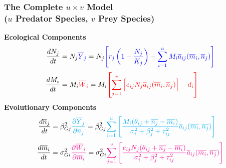 \documentclass[10pt]{beamer}
\begin{document}
\begin{frame}
	\frametitle{The Complete $u\times v$ Model \\ ($u$ Predator Species, $v$ Prey Species)}
	{\bf Ecological Components}
	\begin{align*}
		\frac{dN_j}{dt} &= N_j{\color{blue}\overline{Y}_j} = N_j {\color{blue}\left[r_j\left(1 - \frac{N_j}{K_j}\right) - \sum\limits_{i = 1}^{u}M_i\overline{a}_{ij}(\overline{m}_i, \overline{n}_j)\right]} \\[.1cm]
		\frac{dM_i}{dt} &= M_i{\color{red}\overline{W}_i} = M_i {\color{red}\left[\sum\limits_{j = 1}^{v}\Big[e_{ij}N_j\overline{a}_{ij}(\overline{m}_i, \overline{n}_j)\Big] - d_i\right]}
	\end{align*}
	{\bf Evolutionary Components}
	\begin{align*}
	\frac{d\overline{n}_j}{dt} &= \beta_{Gj}^2{\color{cyan}\frac{\partial \overline{Y}_j}{\partial \overline{n}_j}} = \beta_{Gj}^2{\color{cyan}\sum\limits_{i=1}^{u}\left[\frac{M_i(\theta_{ij} + \overline{n_j} - \overline{m_i})}{\sigma_i^2 + \beta_j^2 + \tau_{ij}^2} \overline{a}_{ij}(\overline{m_i}, \overline{n_j})\right]}\\[.1cm]
	\frac{d\overline{m}_i}{dt} &= \sigma_{Gi}^2{\color{magenta}\frac{\partial \overline{W}_i}{\partial \overline{m}_i}} = \sigma_{Gi}^2{\color{magenta}\sum\limits_{j=1}^{v}\left[\frac{e_{ij}N_j(\theta_{ij} + \overline{n_j} - \overline{m_i})}{\sigma_i^2 + \beta_j^2 + \tau_{ij}^2} \overline{a}_{ij}(\overline{m_i}, \overline{n_j})\right]}
	\end{align*}
\end{frame}
\end{document}
